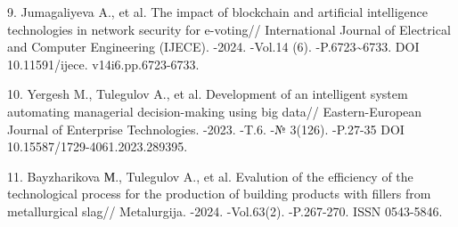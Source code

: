 \begin{refs}
9. Jumagaliyeva A., et al. The impact of blockchain and artificial
intelligence technologies in network security for e-voting//
International Journal of Electrical and Computer Engineering (IJECE).
-2024. -Vol.14 (6). -P.6723\textasciitilde6733. DOI 10.11591/ijece.
v14i6.pp.6723-6733.

10. Yergesh M., Tulegulov A., et al. Development of an intelligent
system automating managerial decision-making using big data//
Eastern-European Journal of Enterprise Technologies. -2023. -T.6. -№
3(126). -P.27-35 DOI 10.15587/1729-4061.2023.289395.

11. Bayzharikova М., Tulegulov A., et al. Evalution of the efficiency of
the technological process for the production of building products with
fillers from metallurgical slag// Metalurgija. -2024. -Vol.63(2).
-P.267-270. ISSN 0543-5846.
\end{refs}


